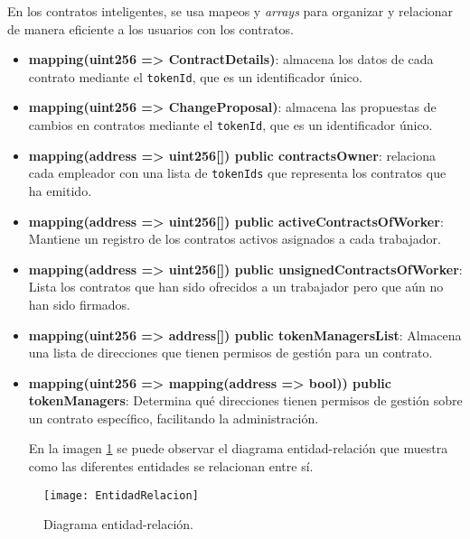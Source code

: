 En los contratos inteligentes, se usa mapeos y \textit{arrays} para organizar y relacionar de manera eficiente a los usuarios con los contratos.

\begin{itemize}

\item \textbf{mapping(uint256 => ContractDetails)}: almacena los datos de cada contrato mediante el \texttt{tokenId}, que es un identificador único.

\item \textbf{mapping(uint256 => ChangeProposal)}: almacena las propuestas de cambios en contratos mediante el \texttt{tokenId}, que es un identificador único.

\item \textbf{mapping(address => uint256[]) public contractsOwner}: relaciona cada empleador con una lista de \texttt{tokenIds} que representa los contratos que ha emitido.

\item \textbf{mapping(address => uint256[]) public activeContractsOfWorker}: Mantiene un registro de los contratos activos asignados a cada trabajador.

\item \textbf{mapping(address => uint256[]) public unsignedContractsOfWorker}: Lista los contratos que han sido ofrecidos a un trabajador pero que aún no han sido firmados.

\item \textbf{mapping(uint256 => address[]) public tokenManagersList}: Almacena una lista de direcciones que tienen permisos de gestión para un contrato.

\item \textbf{mapping(uint256 => mapping(address => bool)) public tokenManagers}: Determina qué direcciones tienen permisos de gestión sobre un contrato específico, facilitando la administración.

En la imagen \ref{img:EntidadRelacion} se puede observar el diagrama entidad-relación que muestra como las diferentes entidades se relacionan entre sí. 

\end{itemize}

\begin{figure}[h]
	\label{img:EntidadRelacion}
	\centering
	\texttt{[image: EntidadRelacion]}
	\caption[Diagrama entidad-relación]{Diagrama entidad-relación.}
\end{figure}


